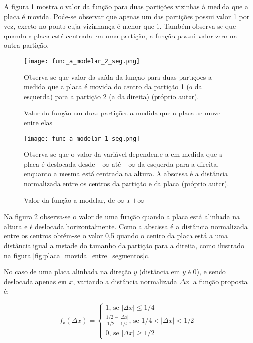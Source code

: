 A figura \ref{fig:func_a_modelar_2_seg} mostra o valor da função para
duas partições vizinhas à medida que a placa é movida. Pode-se observar que
apenas um das partições possui valor 1 por vez, exceto no ponto cuja vizinhança
é menor que 1. Também observa-se
que quando a placa está centrada em uma partição, a função possui valor zero
na outra partição.

\begin{figure}[!htb]
	\centering
	\texttt{[image: func\_a\_modelar\_2\_seg.png]}
	\caption{Valor da função em duas partições a medida que a placa se move
	entre elas}
	\label{fig:func_a_modelar_2_seg}
	Observa-se que valor da saída da função para duas partições a medida que a
	placa é movida do centro da partição 1 (o da esquerda) para a partição 2 (a
	da direita) (próprio autor).
\end{figure}

\begin{figure}[!htb]
	\centering
	\texttt{[image: func\_a\_modelar\_1\_seg.png]}
	\caption{Valor da função a modelar, de $\infty$ a $+\infty$}
	\label{fig:func_a_modelar_1_seg}
	Observa-se que o valor da variável dependente a em medida que a placa
	é deslocada desde $-\infty$ até $+\infty$ da esquerda para a direita,
	enquanto a mesma está centrada na altura. A abscissa é a distância
	normalizada entre os centros da partição e da placa (próprio autor).
\end{figure}

Na figura \ref{fig:func_a_modelar_1_seg} observa-se o valor de uma função
quando a placa está alinhada na altura e é deslocada horizontalmente. Como
a abscissa é a distância normalizada entre os centros obtém-se o valor 0,5
quando o centro da placa está a uma distância igual a metade do tamanho da
partição para a direita, como ilustrado na figura
\ref{fig:placa_movida_entre_segmentos}c.

No caso de uma placa alinhada na direção $y$ (distância em $y$ é 0), e sendo
deslocada apenas em $x$, variando a distância normalizada $\Delta x$, a função
proposta é:

\begin{equation}
	f_x(\Delta x) = \begin{cases}
		1 \text{, se } |\Delta x| \leq 1/4
		\\
		\frac{1/2-|\Delta x|}{1/2-1/4} \text{, se } 1/4<|\Delta x|<1/2
		\\
		0 \text{, se } |\Delta x| \geq 1/2
	\end{cases}
\end{equation}

